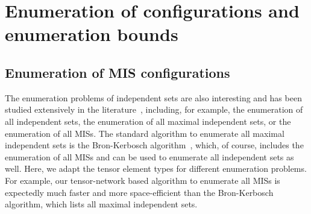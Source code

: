 \documentclass[onefignum, onetabnum]{siamart190516}
\newcommand{\<}{\langle}
\renewcommand{\>}{\rangle}
\newcounter{example}
\begin{document}
\section{Enumeration of configurations and enumeration bounds}
\subsection{Enumeration of MIS configurations}
The enumeration problems of independent sets are also interesting and has been studied extensively in the literature~\cite{Bron1973Algorithm, Eppstein2010Listing, Johnson1988On}, including, for example, the enumeration of all independent sets, the enumeration of all maximal independent sets, or the enumeration of all MISs. The standard algorithm to enumerate all maximal independent sets is the Bron-Kerbosch algorithm~\cite{Bron1973Algorithm}, which, of course, includes the enumeration of all MISs and can be used to enumerate all independent sets as well. Here, we adapt the tensor element types for different enumeration problems. For example, our tensor-network based algorithm to enumerate all MISs is expectedly much faster and more space-efficient than the Bron-Kerbosch algorithm, which lists all maximal independent sets. 
\end{document}
